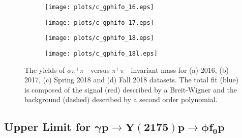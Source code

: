 \begin{center}
\null
\vfill
\begin{figure}[htbp]
    \centering
    \begin{subfigure}[b]{0.49\textwidth}
        \texttt{[image: plots/c\_gphifo\_16.eps]}
        \caption{}
        \label{fig.y2175.xsec_ul.phifo.3.a}
    \end{subfigure}
    \begin{subfigure}[b]{0.49\textwidth}
        \texttt{[image: plots/c\_gphifo\_17.eps]}
        \caption{}
        \label{fig.y2175.xsec_ul.phifo.3.b}
    \end{subfigure}
    \begin{subfigure}[b]{0.49\textwidth}
        \texttt{[image: plots/c\_gphifo\_18.eps]}
        \caption{}
        \label{fig.y2175.xsec_ul.phifo.3.c}
    \end{subfigure}
    \begin{subfigure}[b]{0.49\textwidth}
        \texttt{[image: plots/c\_gphifo\_18l.eps]}
        \caption{}
        \label{fig.y2175.xsec_ul.phifo.3.d}
    \end{subfigure}
    \caption{The yields of $\phi \pi^+ \pi^-$ versus $\pi^+ \pi^-$ invariant mass for (a) 2016, (b) 2017, (c) Spring 2018 and (d) Fall 2018 datasets. The total fit (blue) is composed of the signal (red) described by a Breit-Wigner and the background (dashed) described by a second order polynomial.}
    \label{fig.y2175.xsec_ul.phifo.3}
\end{figure}
\null
\vfill
\end{center}

\newpage
\subsection{Upper Limit for \texorpdfstring{$\bm{\gamma p \rightarrow Y(2175) p \rightarrow \phi f_0 p}$}{}}
\label{chap.y2175.xsec_ul.yphifo}


